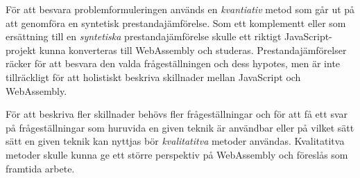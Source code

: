 För att besvara problemformuleringen används en \emph{kvantiativ} metod som går ut på att genomföra en syntetisk prestandajämförelse. Som ett komplementt eller som ersättning till en \emph{syntetiska} prestandajämförelse skulle ett riktigt JavaScript-projekt kunna konverteras till WebAssembly och studeras. Prestandajämförelser räcker för att besvara den valda frågeställningen och dess hypotes, men är inte tillräckligt för att holistiskt beskriva skillnader mellan JavaScript och WebAssembly.  

För att beskriva fler skillnader behövs fler frågeställningar och för att få ett svar på frågeställningar som huruvida en given teknik är användbar eller på vilket sätt sätt en given teknik kan nyttjas bör \emph{kvalitatitva} metoder användas. Kvalitatitva metoder skulle kunna ge ett större perspektiv på WebAssembly och föreslås som framtida arbete.

